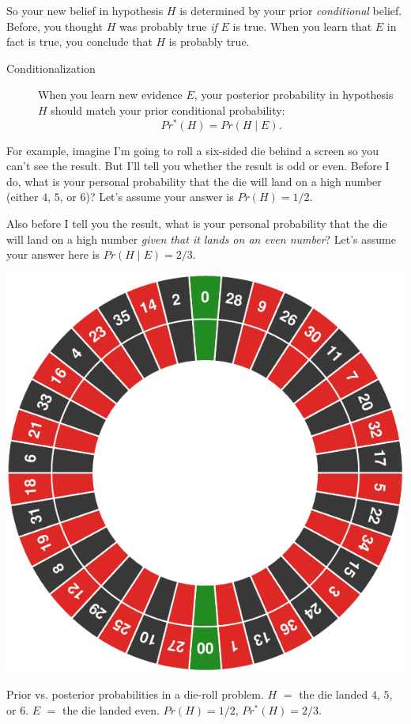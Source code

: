 \documentclass[justified]{tufte-book}
\newcommand{\given}{\mid}
\newcommand{\pr}{Pr}
\newcommand{\po}{Pr^*}
\theoremstyle{definition}
\theoremstyle{definition}
\theoremstyle{definition}
\theoremstyle{remark}
\begin{document}
So your new belief in hypothesis \(H\) is determined by your prior
\emph{conditional} belief. Before, you thought \(H\) was probably true
\emph{if} \(E\) is true. When you learn that \(E\) in fact is true, you
conclude that \(H\) is probably true.

\begin{description}
\item[Conditionalization]
When you learn new evidence \(E\), your posterior probability in
hypothesis \(H\) should match your prior conditional probability:
\[ \po(H) = \pr(H \given E). \]
\end{description}

For example, imagine I'm going to roll a six-sided die behind a screen
so you can't see the result. But I'll tell you whether the result is odd
or even. Before I do, what is your personal probability that the die
will land on a high number (either \(4\), \(5\), or \(6\))? Let's assume
your answer is \(\pr(H) = 1/2\).

Also before I tell you the result, what is your personal probability
that the die will land on a high number \emph{given that it lands on an
even number}? Let's assume your answer here is
\(\pr(H \given E) = 2/3\).

\begin{marginfigure}
\includegraphics{_main_files/figure-latex/unnamed-chunk-131-1} \caption[Prior vs]{Prior vs. posterior probabilities in a die-roll problem. $H$ $=$ the die landed $4$, $5$, or $6$. $E$ $=$ the die landed even. $Pr(H) = 1/2$, $Pr^*(H) = 2/3$.}\label{fig:unnamed-chunk-131}
\end{marginfigure}
\end{document}
